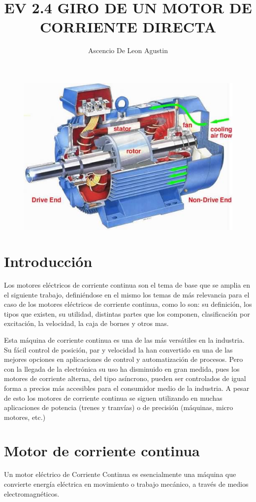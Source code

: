 \documentclass[10pt,letterpaper]{article}
\title{EV 2.4 GIRO DE UN MOTOR DE CORRIENTE DIRECTA}
\author{Ascencio De Leon Agustin}
\begin{document}
\maketitle
\begin{figure}
\centering 
\includegraphics[scale=.5]{01}
\end{figure}
\newpage

\section{Introducción}
Los motores eléctricos de corriente continua son el tema de base que se amplia en el siguiente trabajo, definiéndose en el mismo los temas de más relevancia para el caso de los motores eléctricos de corriente continua, como lo son: su definición, los tipos que existen, su utilidad, distintas partes que los componen, clasificación por excitación, la velocidad, la caja de bornes y otros mas.

Esta máquina de corriente continua es una de las más versátiles en la industria. Su fácil control de posición, par y velocidad la han convertido en una de las mejores opciones en aplicaciones de control y automatización de procesos. Pero con la llegada de la electrónica su uso ha disminuido en gran medida, pues los motores de corriente alterna, del tipo asíncrono, pueden ser controlados de igual forma a precios más accesibles para el consumidor medio de la industria. A pesar de esto los motores de corriente continua se siguen utilizando en muchas aplicaciones de potencia (trenes y 
tranvías) o de precisión (máquinas, micro motores, etc.)

\section{Motor de corriente continua}
Un motor eléctrico de Corriente Continua es esencialmente una máquina que convierte energía eléctrica en movimiento o trabajo mecánico, a través de medios electromagnéticos.
\end{document}
